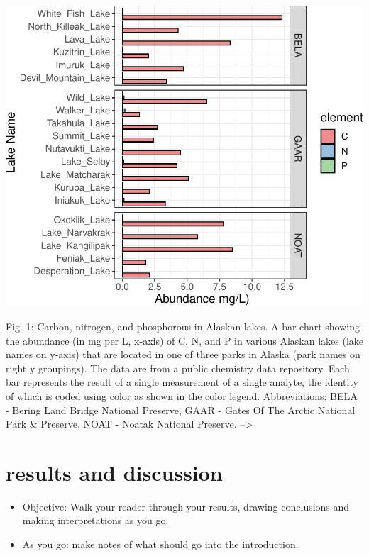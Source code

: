 \documentclass[
]{krantz}
\providecommand{\tightlist}{%
  \setlength{\itemsep}{0pt}\setlength{\parskip}{0pt}}
\begin{document}
\begin{center}\includegraphics[width=1\linewidth]{index_files/figure-latex/unnamed-chunk-182-1} \end{center}

Fig. 1: Carbon, nitrogen, and phosphorous in Alaskan lakes. A bar chart showing the abundance (in mg per L, x-axis) of C, N, and P in various Alaskan lakes (lake names on y-axis) that are located in one of three parks in Alaska (park names on right y groupings). The data are from a public chemistry data repository. Each bar represents the result of a single measurement of a single analyte, the identity of which is coded using color as shown in the color legend. Abbreviations: BELA - Bering Land Bridge National Preserve, GAAR - Gates Of The Arctic National Park \& Preserve, NOAT - Noatak National Preserve. --\textgreater{}

\hypertarget{results-and-discussion}{%
\section{results and discussion}\label{results-and-discussion}}

\begin{itemize}
\tightlist
\item
  Objective: Walk your reader through your results, drawing conclusions and making interpretations as you go.
\end{itemize}

\begin{itemize}
\tightlist
\item
  As you go: make notes of what should go into the introduction.
\end{itemize}
\end{document}
